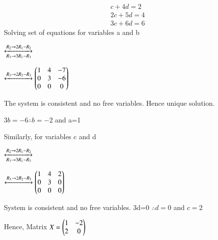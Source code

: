 \documentclass[journal,12pt,twocolumn]{IEEEtran}
\begin{document}
\begin{align}\label{eq2}
c+4d=2\\
2c+5d=4\\
3c+6d=6
\end{align}
Solving set of equations for variables a and b

$\xleftrightarrow[R_3\rightarrow 3R_1-R_3]{R_2\rightarrow 2R_1-R_2}$

$\xleftrightarrow{R_3\rightarrow 2R_2-R_3}
\begin{pmatrix}
1&4&-7\\
0&3&-6\\
0&0&0\end{pmatrix}$

The system is consistent and no free variables. Hence unique solution.

$3b=-6 \therefore b=-2$ and a=1

Similarly, for variables c and d 

$\xleftrightarrow[R_3\rightarrow 3R_1-R_3]{R_2\rightarrow 2R_1-R_2}$

$\xleftrightarrow{R_3\rightarrow 2R_2-R_3}
\begin{pmatrix}
1&4&2\\
0&3&0\\
0&0&0\end{pmatrix}$

System is consistent and no free variables. 
3d=0 $\therefore d=0$ and $c=2$

Hence, Matrix $X=\begin{pmatrix}1&-2\\2&0\end{pmatrix}$
\end{document}
